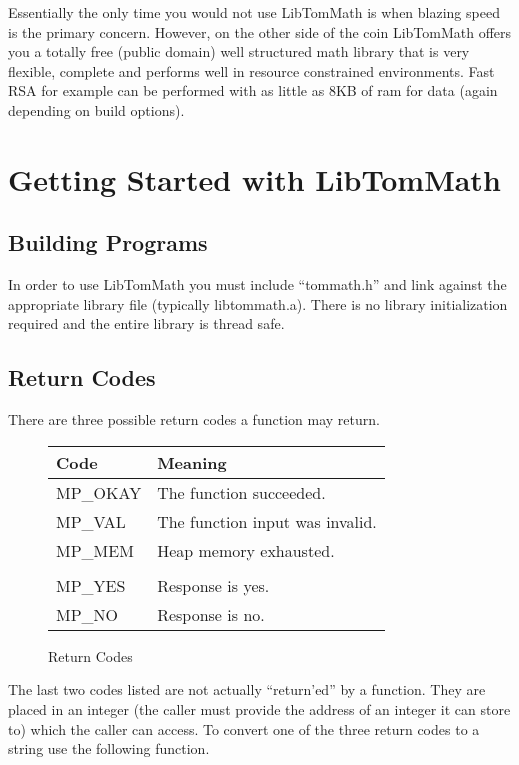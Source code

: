 \documentclass[synpaper]{book}
\begin{document}
Essentially the only time you would not use LibTomMath is when blazing speed is the primary concern.  However,
on the other side of the coin LibTomMath offers you a totally free (public domain) well structured math library
that is very flexible, complete and performs well in resource constrained environments.  Fast RSA for example can
be performed with as little as 8KB of ram for data (again depending on build options).

\chapter{Getting Started with LibTomMath}
\section{Building Programs}
In order to use LibTomMath you must include ``tommath.h'' and link against the appropriate library file (typically
libtommath.a).  There is no library initialization required and the entire library is thread safe.

\section{Return Codes}
There are three possible return codes a function may return.

\begin{figure}[h!]
\begin{center}
\begin{small}
\begin{tabular}{|l|l|}
\hline \textbf{Code} & \textbf{Meaning} \\
\hline MP\_OKAY & The function succeeded. \\
\hline MP\_VAL  & The function input was invalid. \\
\hline MP\_MEM  & Heap memory exhausted. \\
\hline &\\
\hline MP\_YES  & Response is yes. \\
\hline MP\_NO   & Response is no. \\
\hline
\end{tabular}
\end{small}
\end{center}
\caption{Return Codes}
\end{figure}

The last two codes listed are not actually ``return'ed'' by a function.  They are placed in an integer (the caller must
provide the address of an integer it can store to) which the caller can access.  To convert one of the three return codes
to a string use the following function.
\end{document}
